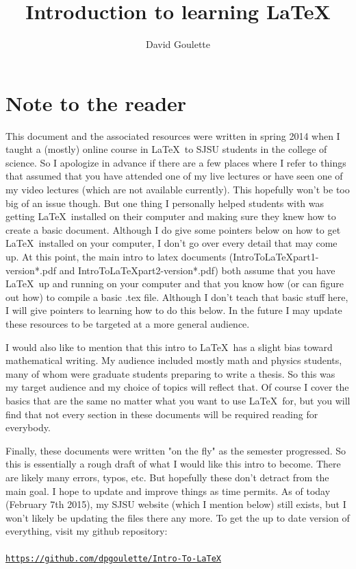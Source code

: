 \documentclass[11pt]{article}
\begin{document}
\author{David Goulette}
\title{Introduction to learning \LaTeX}
\maketitle
\section{Note to the reader}
This document and the associated resources were written in spring 2014 when I taught a (mostly) online course in \LaTeX\ to SJSU students in the college of science.  So I apologize in advance if there are a few places where I refer to things that assumed that you have attended one of my live lectures or have seen one of my video lectures (which are not available currently). This hopefully won't be too big of an issue though. But one thing I personally helped students with was getting \LaTeX\ installed on their computer and making sure they knew how to create a basic document.  Although I do give some pointers below on how to get \LaTeX\ installed on your computer, I don't go over every detail that may come up.  At this point, the main intro to latex documents (IntroToLaTeXpart1-version*.pdf and IntroToLaTeXpart2-version*.pdf) both assume that you have \LaTeX\ up and running on your computer and that you know how (or can figure out how) to compile a basic .tex file.  Although I don't teach that basic stuff here, I will give pointers to learning how to do this below.  In the future I may update these resources to be targeted at a more general audience.

I would also like to mention that this intro to \LaTeX\ has a slight bias toward mathematical writing.  My audience included mostly math and physics students, many of whom were graduate students preparing to write a thesis.  So this was my target audience and my choice of topics will reflect that.  Of course I cover the basics that are the same no matter what you want to use \LaTeX\ for, but you will find that not every section in these documents will be required reading for everybody.  

Finally, these documents were written "on the fly" as the semester progressed.  So this is essentially a rough draft of what I would like this intro to become.  There are likely many errors, typos, etc.  But hopefully these don't detract from the main goal.  I hope to update and improve things as time permits.  As of today (February 7th 2015), my SJSU website (which I mention below) still exists, but I won't likely be updating the files there any more.  To get the up to date version of everything, visit my github repository:\\\\
\href{https://github.com/dpgoulette/Intro-To-LaTeX}{\texttt{https://github.com/dpgoulette/Intro-To-LaTeX}}
\end{document}
